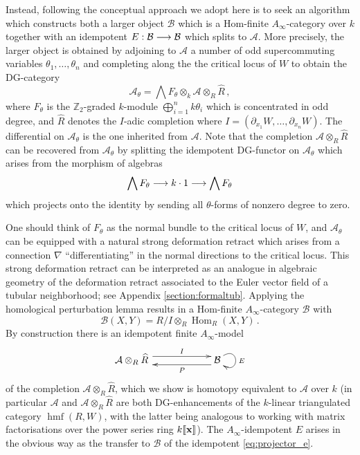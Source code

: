 \documentclass[english,letter paper,12pt,leqno]{article}
\theoremstyle{example}
\numberwithin{equation}{section}
\def\AA{\mathcal{A}}
\def\BB{\mathcal{B}}
\def\Hom{\operatorname{Hom}}
\def\be{\begin{equation}}
\def\ee{\end{equation}}
\def\nZ{\mathds{Z}}
\DeclareMathOperator{\hmf}{hmf}
\begin{document}
Instead, following \cite{pushforward} the conceptual approach we adopt here is to seek an algorithm which constructs both a larger object $\mathcal{B}$ which is a Hom-finite $A_\infty$-category over $k$ together with an idempotent $E: \mathcal{B} \longrightarrow \mathcal{B}$ which splits to $\AA$. More precisely, the larger object is obtained by adjoining to $\AA$ a number of odd supercommuting variables $\theta_1,\ldots,\theta_n$ and completing along the the critical locus of $W$ to obtain the DG-category
\[
\AA_\theta = \bigwedge F_\theta \otimes_k \AA \otimes_R \widehat{R}\,,
\]
where $F_\theta$ is the $\nZ_2$-graded $k$-module $\bigoplus_{i=1}^n k \theta_i$ which is concentrated in odd degree, and $\widehat{R}$ denotes the $I$-adic completion where $I = (\partial_{x_1} W, \ldots, \partial_{x_n} W)$. The differential on $\AA_\theta$ is the one inherited from $\AA$. Note that the completion $\AA \otimes_R \widehat{R}$ can be recovered from $\AA_\theta$ by splitting the idempotent DG-functor on $\AA_\theta$ which arises from the morphism of algebras
\be\label{eq:projector_e}
\bigwedge F_\theta \lto k \cdot 1 \lto \bigwedge F_\theta
\ee
which projects onto the identity by sending all $\theta$-forms of nonzero degree to zero.

One should think of $F_\theta$ as the normal bundle to the critical locus of $W$, and $\AA_\theta$ can be equipped with a natural strong deformation retract which arises from a connection $\nabla$ ``differentiating'' in the normal directions to the critical locus. This strong deformation retract can be interpreted as an analogue in algebraic geometry of the deformation retract associated to the Euler vector field of a tubular neighborhood; see Appendix \ref{section:formaltub}. Applying the homological perturbation lemma results in a Hom-finite $A_\infty$-category $\BB$ with
\[
\BB(X,Y) = R/I \otimes_R \Hom_R(X,Y)\,.
\]
By construction there is an idempotent finite $A_\infty$-model
\[
\xymatrix@C+3pc{
\AA \otimes_R \widehat{R}\, \ar@<1ex>[r]^-I & \mathcal{B} \ar@(ur,dr)^E \ar@<1ex>[l]^-P
}
\]
of the completion $\AA \otimes_R \widehat{R}$, which we show is homotopy equivalent to $\AA$ over $k$ (in particular $\AA$ and $\AA \otimes_R \widehat{R}$ are both DG-enhancements of the $k$-linear triangulated category $\hmf(R,W)$, with the latter being analogous to working with matrix factorisations over the power series ring $k\llbracket \bold{x} \rrbracket$). The $A_\infty$-idempotent $E$ arises in the obvious way as the transfer to $\BB$ of the idempotent \eqref{eq:projector_e}.
\end{document}
